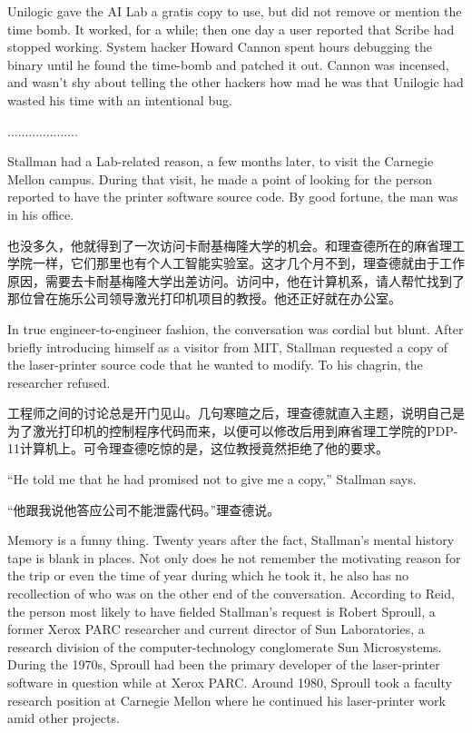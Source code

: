 \ifdefined\eng
Unilogic gave the AI Lab a gratis copy to use, but did not remove or mention the time bomb.  It worked, for a while; then one day a user reported that Scribe had stopped working.  System hacker Howard Cannon spent hours debugging the binary until he found the time-bomb and patched it out.  Cannon was incensed, and wasn't shy about telling the other hackers how mad he was that Unilogic had wasted his time with an intentional bug.
\fi

\ifdefined\chs
....................
\fi

\ifdefined\eng
Stallman had a Lab-related reason, a few months later, to visit the Carnegie Mellon campus. During that visit, he made a point of looking for the person reported to have the printer software source code.  By good fortune, the man was  in his office.
\fi

\ifdefined\chs
也没多久，他就得到了一次访问卡耐基梅隆大学的机会。和理查德所在的麻省理工学院一样，它们那里也有个人工智能实验室。这才几个月不到，理查德就由于工作原因，需要去卡耐基梅隆大学出差访问。访问中，他在计算机系，请人帮忙找到了那位曾在施乐公司领导激光打印机项目的教授。他还正好就在办公室。
\fi

\ifdefined\eng
In true engineer-to-engineer fashion, the conversation was cordial but blunt. After briefly introducing himself as a visitor from MIT, Stallman requested a copy of the laser-printer source code that he wanted to modify. To his chagrin, the researcher refused.
\fi

\ifdefined\chs
工程师之间的讨论总是开门见山。几句寒暄之后，理查德就直入主题，说明自己是为了激光打印机的控制程序代码而来，以便可以修改后用到麻省理工学院的PDP-11计算机上。可令理查德吃惊的是，这位教授竟然拒绝了他的要求。
\fi

\ifdefined\eng
``He told me that he had promised not to give me a copy,'' Stallman says.
\fi

\ifdefined\chs
“他跟我说他答应公司不能泄露代码。”理查德说。
\fi

\ifdefined\eng
Memory is a funny thing. Twenty years after the fact, Stallman's mental history tape is blank in places. Not only does he not remember the motivating reason for the trip or even the time of year during which he took it, he also has no recollection of who was on the other end of the conversation. According to Reid, the person most likely to have fielded Stallman's request is Robert Sproull, a former Xerox PARC researcher and current director of Sun Laboratories, a research division of the computer-technology conglomerate Sun Microsystems. During the 1970s, Sproull had been the primary developer of the laser-printer software in question while at Xerox PARC. Around 1980, Sproull took a faculty research position at Carnegie Mellon where he continued his laser-printer work amid other projects.
\fi

